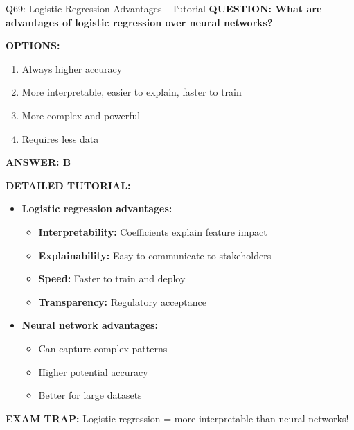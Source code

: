 \documentclass[8pt]{beamer}
\begin{document}
	\begin{frame}{Q69: Logistic Regression Advantages - Tutorial}
		\fontsize{6.5}{7.5}\selectfont
		\textbf{QUESTION: What are advantages of logistic regression over neural networks?}
		
		\vspace{0.1cm}
		\textbf{OPTIONS:}
		\begin{enumerate}
			\item Always higher accuracy
			\item More interpretable, easier to explain, faster to train
			\item More complex and powerful
			\item Requires less data
		\end{enumerate}
		
		\vspace{0.1cm}
		\textcolor{myblue}{\textbf{ANSWER: B}}
		
		\vspace{0.1cm}
		\textbf{DETAILED TUTORIAL:}
		\begin{itemize}
			\item \textbf{Logistic regression advantages:}
			\begin{itemize}
				\item \textbf{Interpretability:} Coefficients explain feature impact
				\item \textbf{Explainability:} Easy to communicate to stakeholders
				\item \textbf{Speed:} Faster to train and deploy
				\item \textbf{Transparency:} Regulatory acceptance
			\end{itemize}
			\item \textbf{Neural network advantages:}
			\begin{itemize}
				\item Can capture complex patterns
				\item Higher potential accuracy
				\item Better for large datasets
			\end{itemize}
		\end{itemize}
		
		\textcolor{myred}{\textbf{EXAM TRAP:}} Logistic regression = \textcolor{myblue}{more interpretable} than neural networks!
	\end{frame}
	
\end{document}
